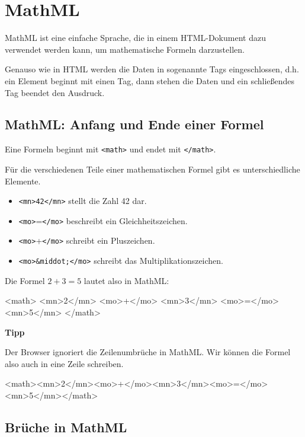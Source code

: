 \section{MathML}

MathML ist eine einfache Sprache, die in einem HTML-Dokument dazu verwendet werden kann, um mathematische Formeln darzustellen.

Genauso wie in HTML werden die Daten in sogenannte Tags eingeschlossen, d.h. ein Element beginnt mit einen Tag, dann stehen die Daten und ein schließendes Tag beendet den Ausdruck. 

\subsection*{MathML: Anfang und Ende einer Formel}

Eine Formeln beginnt mit \texttt{<math>} und endet mit \texttt{</math>}.

Für die verschiedenen Teile einer mathematischen Formel gibt es unterschiedliche Elemente.
\begin{itemize}
	\item \texttt{<mn>42</mn>} stellt die Zahl 42 dar.
	\item \texttt{<mo>}=\texttt{</mo>} beschreibt ein Gleichheitszeichen.
	\item \texttt{<mo>}+\texttt{</mo>} schreibt ein Pluszeichen.
	\item \texttt{<mo>\&middot;</mo>} schreibt das Multiplikationszeichen.
\end{itemize}

Die Formel $2 + 3 = 5$ lautet also in MathML:

\begin{codeHTML}
<math>
	<mn>2</mn>
	<mo>+</mo>
	<mn>3</mn>
	<mo>=</mo>
	<mn>5</mn>
</math>
\end{codeHTML}

\textbf{Tipp}

Der Browser ignoriert die Zeilenumbrüche in MathML. Wir können die Formel also auch in eine Zeile schreiben.

\begin{codeHTML}
<math><mn>2</mn><mo>+</mo><mn>3</mn><mo>=</mo><mn>5</mn></math>
\end{codeHTML}

\subsection*{Brüche in MathML}


